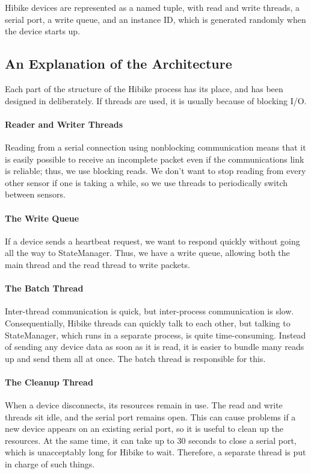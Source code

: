 \documentclass[12pt]{book}
\begin{document}
Hibike devices are represented as a named tuple, with read and write
threads, a serial port, a write queue, and an instance ID, which
is generated randomly when the device starts up.

\subsection{An Explanation of the Architecture}
Each part of the structure of the Hibike process has its place, and has
been designed in deliberately. If threads are used, it is usually because
of blocking I/O.

\paragraph{Reader and Writer Threads}
Reading from a serial connection using nonblocking communication means that it
is easily possible to receive an incomplete packet even if the communications
link is reliable; thus, we use blocking reads. We don't want to stop reading
from every other sensor if one is taking a while, so we use threads to
periodically switch between sensors.

\paragraph{The Write Queue}
If a device sends a heartbeat request, we want to respond quickly
without going all the way to StateManager. Thus, we have a write queue, allowing
both the main thread and the read thread to write packets.

\paragraph{The Batch Thread}
Inter-thread communication is quick, but inter-process communication is slow.
Consequentially,
Hibike threads can quickly talk to each other, but talking to StateManager, which
runs in a separate process, is quite time-consuming. Instead of
sending any device data as soon as it is read, it is easier to bundle many
reads up and send them all at once. The batch thread is responsible for this.

\paragraph{The Cleanup Thread}
When a device disconnects, its resources remain in use. The read
and write threads sit idle, and the serial port remains open. This
can cause problems if a new device appears on an existing serial port,
so it is useful to clean up the resources. At the same time, it
can take up to 30 seconds to close a serial port, which is unacceptably
long for Hibike to wait. Therefore, a separate thread is put in charge
of such things.
\end{document}
